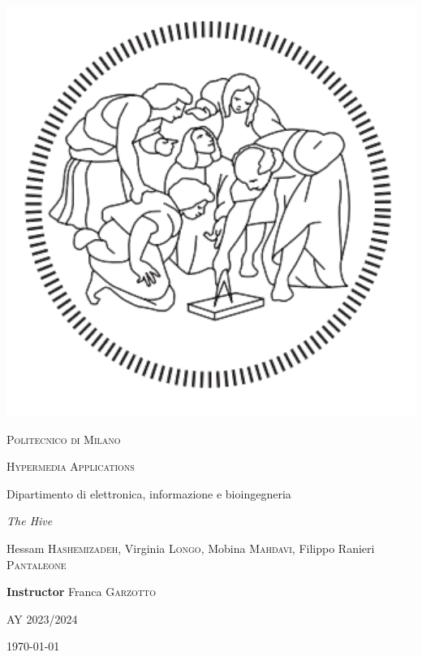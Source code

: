 \begin{titlepage}

\thispagestyle{empty}
\setlength\headheight{0pt}
\begin{center}

\begin{center}
\includegraphics[width=0.25\linewidth]{img/polimi.png}
\end{center}


        {\scshape\LARGE Politecnico di Milano  \par}
        \vspace{2.5cm}
        {\scshape\Large Hypermedia Applications \par}
        Dipartimento di elettronica, informazione e bioingegneria\\
        \vspace{1cm}
        \begin{center}
		\end{center}
        {\Large\itshape The Hive\par}
        \vspace{1cm}

\begin{center}
		\normalsize Hessam \textsc{Hashemizadeh}, Virginia \textsc{Longo}, Mobina \textsc{Mahdavi}, Filippo Ranieri \textsc{Pantaleone}
\end{center}

\begin{center}
		\footnotesize \textbf{Instructor} Franca \textsc{Garzotto}
\end{center}

\vspace{1cm}
{\Large AY 2023/2024\par}
\vspace{0.5cm}
\large
\today

\end{center}

\clearpage
\restoregeometry
\end{titlepage}
